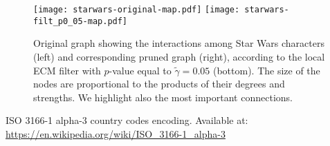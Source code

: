 \documentclass[aps,twocolumn,superscriptaddress]{revtex4-1}
\begin{document}
%
%
%
\begin{figure*}[h!]
\centering
%
\texttt{[image: starwars-original-map.pdf]}
\texttt{[image: starwars-filt\_p0\_05-map.pdf]}
%
\caption{Original graph showing the interactions among Star Wars characters (left) and corresponding pruned graph (right), according to the local ECM filter with $p$-value equal to $\widetilde{\gamma} = 0.05$ (bottom). The size of the nodes are proportional to the products of their degrees and strengths. We highlight also the most important connections.}

\label{fig:starwars_filtered}
\end{figure*}



\begin{thebibliography}{9}





 ISO 3166-1 alpha-3 country codes encoding. Available at: \url{https://en.wikipedia.org/wiki/ISO_3166-1_alpha-3}


\end{thebibliography}
\end{document}
